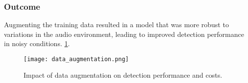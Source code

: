\subsubsection{Outcome}
Augmenting the training data resulted in a model that was more robust to variations in the audio environment, leading to improved detection performance in noisy conditions.
\ref{fig:data_augmentation}.

\begin{figure}[h]
\centering
\texttt{[image: data\_augmentation.png]}
\caption{Impact of data augmentation on detection performance and costs.}
\label{fig:data_augmentation}
\end{figure}
